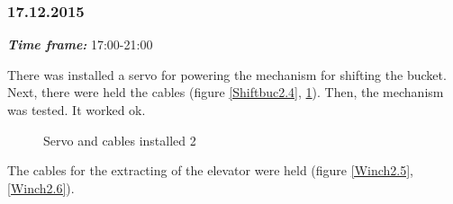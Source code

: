 \subsubsection{17.12.2015}
\textit{\textbf{Time frame:}} 17:00-21:00 

There was installed a servo for powering the mechanism for shifting the bucket. Next, there were held the cables (figure \ref{Shiftbuc2.4}, \ref{Shiftbuc2.5}). Then, the mechanism was tested. It worked ok.

\begin{figure}[H]
	\begin{minipage}[h]{0.47\linewidth}
		\caption{Servo and cables installed 1}
		\label{Shiftbuc2.4}
	\end{minipage}
	\hfill
	\begin{minipage}[h]{0.47\linewidth}
		\caption{Servo and cables installed 2}
		\label{Shiftbuc2.5}
	\end{minipage}
\end{figure}

The cables for the extracting of the elevator were held (figure \ref{Winch2.5}, \ref{Winch2.6}).

